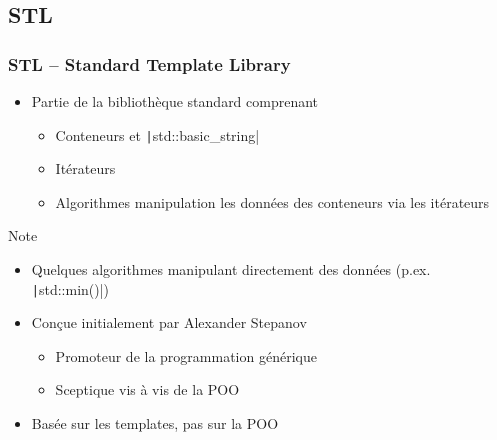\documentclass[C++.tex]{subfiles}
\begin{document}
\subsection*{STL}
\begin{frame}[fragile]
	\frametitle{STL -- Standard Template Library}
	\begin{itemize}
		\item Partie de la bibliothèque standard comprenant
		\begin{itemize}
			\item Conteneurs et \texttt|std::basic_string|
			\item Itérateurs
			\item Algorithmes manipulation les données des conteneurs via les itérateurs
		\end{itemize}
	\end{itemize}

	\begin{block}{Note}
		\begin{itemize}
			\item Quelques algorithmes manipulant directement des données (p.ex. \texttt|std::min()|)
		\end{itemize}
	\end{block}

	\begin{itemize}
		\item Conçue initialement par Alexander Stepanov
		\begin{itemize}
			\item Promoteur de la programmation générique


			\item Sceptique vis à vis de la POO


		\end{itemize}
		\item Basée sur les templates, pas sur la POO
	\end{itemize}
\end{frame}
\end{document}
